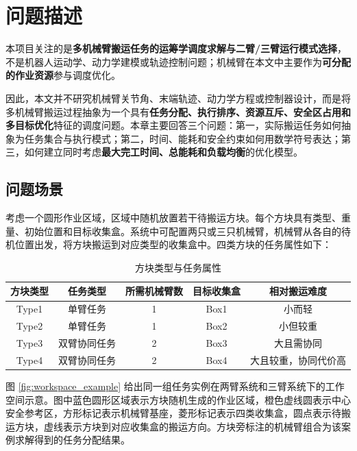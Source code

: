 \section{问题描述}

本项目关注的是\textbf{多机械臂搬运任务的运筹学调度求解与二臂/三臂运行模式选择}，不是机器人运动学、动力学建模或轨迹控制问题；机械臂在本文中主要作为\textbf{可分配的作业资源}参与调度优化。

因此，本文并不研究机械臂关节角、末端轨迹、动力学方程或控制器设计，而是将多机械臂搬运过程抽象为一个具有\textbf{任务分配、执行排序、资源互斥、安全区占用和多目标优化}特征的调度问题。本章主要回答三个问题：第一，实际搬运任务如何抽象为任务集合与执行模式；第二，时间、能耗和安全约束如何用数学符号表达；第三，如何建立同时考虑\textbf{最大完工时间、总能耗和负载均衡}的优化模型。

\subsection{问题场景}

考虑一个圆形作业区域，区域中随机放置若干待搬运方块。每个方块具有类型、重量、初始位置和目标收集盒。系统中可配置两只或三只机械臂，机械臂从各自的待机位置出发，将方块搬运到对应类型的收集盒中。四类方块的任务属性如下：

\begin{table}[H]
    \centering
    \caption{方块类型与任务属性}
    \begin{tabular}{ccccc}
        \toprule
        方块类型 & 任务类型 & 所需机械臂数 & 目标收集盒 & 相对搬运难度 \\
        \midrule
        Type1 & 单臂任务 & 1 & Box1 & 小而轻 \\
        Type2 & 单臂任务 & 1 & Box2 & 小但较重 \\
        Type3 & 双臂协同任务 & 2 & Box3 & 大且需协同 \\
        Type4 & 双臂协同任务 & 2 & Box4 & 大且较重，协同代价高 \\
        \bottomrule
    \end{tabular}
    \label{tab:block_type_task}
\end{table}

图 \ref{fig:workspace_example} 给出同一组任务实例在两臂系统和三臂系统下的工作空间示意。图中蓝色圆形区域表示方块随机生成的作业区域，橙色虚线圆表示中心安全参考区，方形标记表示机械臂基座，菱形标记表示四类收集盒，圆点表示待搬运方块，虚线表示方块到对应收集盒的搬运方向。方块旁标注的机械臂组合为该案例求解得到的任务分配结果。


